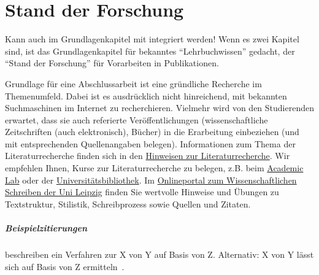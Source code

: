 \chapter{Stand der Forschung}\label{ch:relatedWork}

Kann auch im Grundlagenkapitel mit integriert werden! Wenn es zwei Kapitel sind, ist das Grundlagenkapitel für bekanntes \enquote{Lehrbuchwissen} gedacht, der \enquote{Stand der Forschung} für Vorarbeiten in Publikationen.

Grundlage für eine Abschlussarbeit ist eine gründliche Recherche im Themenumfeld.
Dabei ist es ausdrücklich nicht hinreichend, mit bekannten Suchmaschinen im Internet zu recherchieren.
Vielmehr wird von den Studierenden erwartet, dass sie auch referierte Veröffentlichungen (wissenschaftliche Zeitschriften (auch elektronisch), Bücher) in die Erarbeitung einbeziehen (und mit entsprechenden Quellenangaben belegen).
Informationen zum Thema der Literaturrecherche finden sich in den \href{http://www.imise.uni-leipzig.de/Lehre/MedInf/Abschlussarbeiten/Literaturrecherche}{Hinweisen zur Literaturrecherche}.
Wir empfehlen Ihnen, Kurse zur Literaturrecherche zu belegen, z.B. beim \href{https://home.uni-leipzig.de/academiclab/}{Academic Lab} oder der \href{https://www.ub.uni-leipzig.de/service/workshops-und-online-tutorials/}{Universitätsbibliothek}.
Im \href{https://home.uni-leipzig.de/schreibportal/}{Onlineportal zum Wissenschaftlichen Schreiben der Uni Leipzig} finden Sie wertvolle Hinweise und Übungen zu Textstruktur, Stilistik, Schreibprozess sowie Quellen und Zitaten.

\paragraph{Beispielzitierungen}
\citet{sniktec} beschreiben ein Verfahren zur X von Y auf Basis von Z.
Alternativ: X von Y lässt sich auf Basis von Z ermitteln~\citep{sniktec}.

